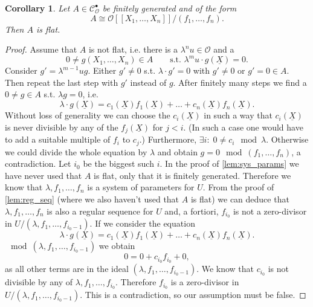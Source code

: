 \documentclass{article}
\theoremstyle{plain}%
\newtheorem{corollary}{Corollary}[section]
\theoremstyle{definition}
\theoremstyle{remark}
\newcommand{\cob}{\mathcal{C}_\mathcal{O}^\bullet}
\begin{document}
\begin{corollary}
    Let \(A \in \cob\) be finitely generated and of the form
    \[
        A \cong \mathcal{O}[[X_1, \dots, X_n]]/(f_1, \dots, f_n).  
    \]
    Then \(A\) is flat.
\end{corollary}
\begin{proof}
    Assume that \(A\) is not flat, i.e. there is a \(\lambda^n u \in \mathcal{O}\) and a
    \[0 \neq g(X_1, \dots, X_n) \in A \qquad \text{s.t. } \lambda^m u \cdot g(\underline{X}) = 0.\]
    Consider \(g' = \lambda^{m-1}u g\). 
    Either \(g' \neq 0\) s.t. \(\lambda \cdot g' = 0\) with \(g' \neq 0\) or \(g' = 0 \in A\).
    Then repeat the last step with \(g'\) instead of \(g\). After finitely many steps we find a \(0 \neq g \in A\) s.t. 
    \(\lambda g = 0\), i.e.
    \[
        \lambda \cdot g(\underline{X}) = c_1(\underline{X})f_1(\underline{X}) + \dots + c_n(\underline{X})f_n(\underline{X}). 
    \]
    Without loss of generality we can choose the \(c_i(\underline{X})\) in such a way that \(c_i(\underline{X})\) 
    is never divisible by any of the \(f_{j}(\underline{X})\) for \(j < i\). 
    (In such a case one would have to add a suitable multiple of \(f_i\) to \(c_j\).)
    Furthermore, \(\exists i\colon\;0 \neq c_i \mod \lambda\). Otherwise we could divide the whole equation by
    \(\lambda\) and obtain \(g = 0 \mod (f_1, \dots, f_n)\), a contradiction. Let \(i_0\) be the biggest such \(i\).
    In the proof of \cref{lem:sys_params} we have never used that \(A\) is flat, 
    only that it is finitely generated. Therefore we know that \(\lambda, f_1, \dots, f_n\) is a system of parameters
    for \(U\). 
    From the proof of \cref{lem:reg_seq} (where we also haven't used that \(A\) is flat) we can deduce that
    \(\lambda, f_1, \dots, f_n\) is also a regular sequence for \(U\) and, a fortiori, \(f_{i_0}\) is not a 
    zero-divisor in \(U/(\lambda, f_1, \dots, f_{i_0-1})\).
    If we consider the equation
    \[
        \lambda \cdot g(\underline{X}) = c_1(\underline{X})f_1(\underline{X}) + \dots + c_n(\underline{X})f_n(\underline{X}). 
    \]
    \(\mod (\lambda, f_1, \dots, f_{i_0-1})\) we obtain
    \[
        0 = 0 + c_{i_0} f_{i_0} + 0,
    \]
    as all other terms are in the ideal \((\lambda, f_1, \dots, f_{i_0-1})\).
    We know that \(c_{i_0}\) is not divisible by any of \(\lambda, f_1, \dots, f_{i_0}\).
    Therefore \(f_{i_0}\) is a zero-divisor in \(U/(\lambda, f_1, \dots, f_{i_0-1})\). This is a contradiction,
    so our assumption must be false.
\end{proof}
\end{document}
